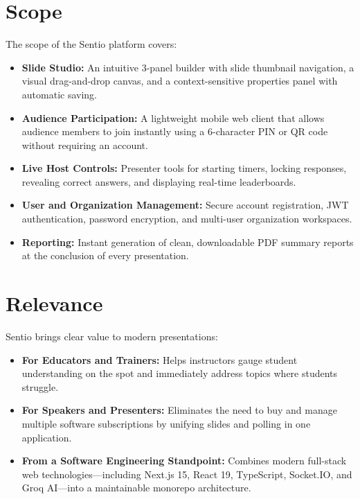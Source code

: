 \section{Scope}

The scope of the Sentio platform covers:

\begin{itemize}
    \item \textbf{Slide Studio:} An intuitive 3-panel builder with slide thumbnail navigation, a visual drag-and-drop canvas, and a context-sensitive properties panel with automatic saving.
    \item \textbf{Audience Participation:} A lightweight mobile web client that allows audience members to join instantly using a 6-character PIN or QR code without requiring an account.
    \item \textbf{Live Host Controls:} Presenter tools for starting timers, locking responses, revealing correct answers, and displaying real-time leaderboards.
    \item \textbf{User and Organization Management:} Secure account registration, JWT authentication, password encryption, and multi-user organization workspaces.
    \item \textbf{Reporting:} Instant generation of clean, downloadable PDF summary reports at the conclusion of every presentation.
\end{itemize}

\section{Relevance}

Sentio brings clear value to modern presentations:

\begin{itemize}
    \item \textbf{For Educators and Trainers:} Helps instructors gauge student understanding on the spot and immediately address topics where students struggle.
    \item \textbf{For Speakers and Presenters:} Eliminates the need to buy and manage multiple software subscriptions by unifying slides and polling in one application.
    \item \textbf{From a Software Engineering Standpoint:} Combines modern full-stack web technologies—including Next.js 15, React 19, TypeScript, Socket.IO, and Groq AI—into a maintainable monorepo architecture.
\end{itemize}

